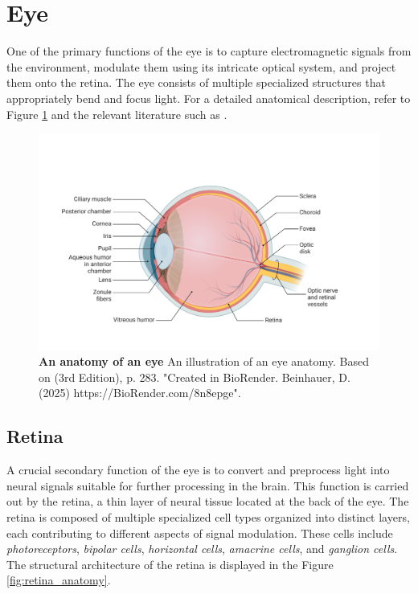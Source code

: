 \section{Eye}
\label{sec:eye}
One of the primary functions of the eye is to capture electromagnetic signals from
the environment, modulate them using its intricate optical system, and project them
onto the retina. The eye consists of multiple specialized structures that
appropriately bend and focus light. For a detailed anatomical description, 
refer to Figure \ref{fig:eye} and the relevant literature such as \citet{snell2013clinical}.

\begin{figure}
    \centering
    \includegraphics[width=\linewidth]{img/eye.pdf}
    \caption{\textbf{An anatomy of an eye} An illustration of an eye anatomy. Based on \citet{bear2020neuroscience} (3rd Edition), p. 283. "Created in BioRender. Beinhauer, D. (2025) https://BioRender.com/8n8epge".}
    \label{fig:eye}
\end{figure}


\subsection{Retina}
\label{subsec:retina}
A crucial secondary function of the eye is to convert and preprocess light into
neural signals suitable for further processing in the brain. This function is
carried out by the retina, a thin layer of neural tissue located at the back of
the eye. The retina is composed of multiple specialized cell types organized into
distinct layers, each contributing to different aspects of signal modulation. These
cells include \emph{photoreceptors}, \emph{bipolar cells}, \emph{horizontal cells}, 
\emph{amacrine cells}, and \emph{ganglion cells}. The structural architecture of the retina is displayed in the Figure \ref{fig:retina_anatomy}.

